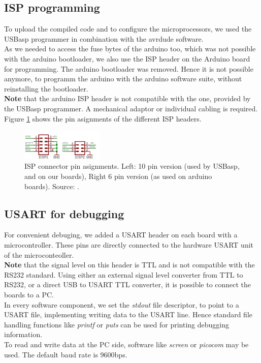 \documentclass[a4paper]{scrreprt}
\begin{document}
\subsection{ISP programming}\label{chap:isp}
To upload the compiled code and to configure the microprocessors, we used the USBasp programmer in combination with the avrdude software.\\
As we needed to access the fuse bytes of the arduino too, which was not possible with the arduino bootloader, we also use the ISP header on the Arduino board for programming. The arduino bootloader was removed. Hence it is not possible anymore, to programm the arduino with the arduino software suite, without reinstalling the bootloader.\\
\textbf{Note} that the arduino ISP header is not compatible with the one, provided by the USBasp programmer. A mechanical adaptor or individual cabling is required. 
Figure \ref{fig:isp} shows the pin asignments of the different ISP headers.
\begin{figure}[htbp]
	\centering
	\includegraphics[width=0.35\textwidth]{img/isp.png}
  \caption{ISP connector pin asignments. Left: 10 pin version (used by USBasp, and on our boards), Right 6 pin version (as used on arduino boards). Source: \cite{micronet}.}
	\label{fig:isp}
\end{figure}
\subsection{USART for debugging}
For convenient debuging, we added a USART header on each board with a microcontroller. 
These pins are directly connected to the hardware USART unit of the microconteoller.\\ 
\textbf{Note} that the signal level on this header is TTL and is not compatible with the RS232 standard. Using either an external signal level converter from TTL to RS232, or a direct USB to USART TTL converter, it is possible to connect the boards to a PC.\\
In every software component, we set the \emph{stdout} file descriptor, to point to a USART file, implementing writing data to the USART line.
Hence standard file handling functions like \emph{printf} or \emph{puts} can be used for printing debugging information.\\
To read and write data at the PC side, software like \emph{screen} or \emph{picocom} may be used. The default baud rate is 9600bps.
\end{document}
